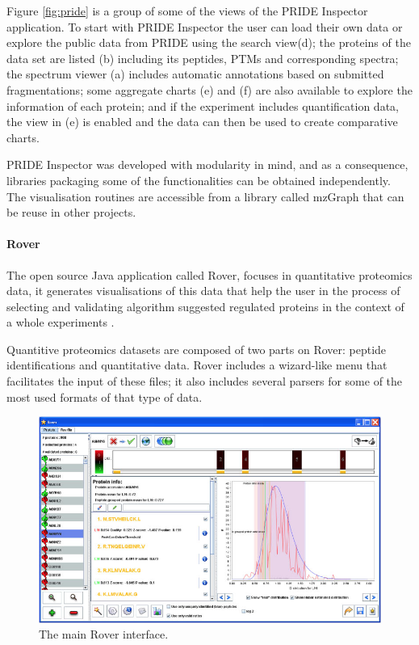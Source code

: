 Figure \ref{fig:pride} is a group of some of the views of the PRIDE Inspector application. To start with PRIDE Inspector the user can load their own data or explore the public data from PRIDE using the search view(d); the proteins of the data set are listed (b) including its peptides, PTMs and corresponding spectra; the spectrum viewer (a) includes automatic annotations based on submitted fragmentations; some aggregate charts (e) and (f) are also  available to explore the information of each protein; and if the experiment includes quantification data, the view in (e) is enabled and the data can then be used to create comparative charts.

PRIDE Inspector was developed with modularity in mind, and as a consequence, libraries packaging some of the functionalities can be obtained independently. The visualisation routines are accessible from a library called mzGraph that can be reuse in other projects.

\paragraph{Rover}
The open source Java application called Rover, focuses in quantitative proteomics data, it generates visualisations of this data that help the user in the process of selecting and validating  algorithm suggested regulated proteins in the context of a whole experiments \cite{PER2014}.

Quantitive proteomics datasets are composed of two parts on Rover: peptide identifications and quantitative data. Rover includes a wizard-like menu that facilitates the input of these files; it also includes several parsers for some of the most used formats of that type of data.

\begin{figure}  
\centering
\includegraphics[width=\textwidth]{figures/rover.png}
\caption[The main Rover interface.]{The main Rover interface.
\label{fig:rover}}
\end{figure}

